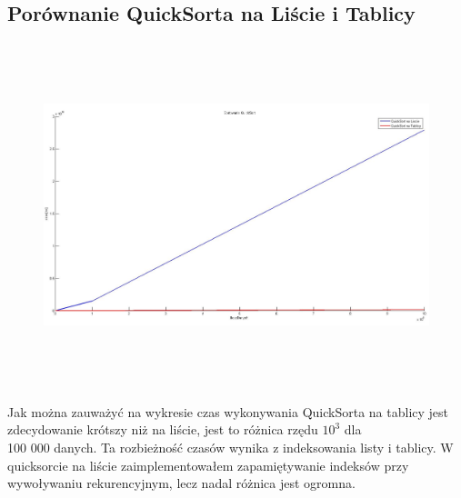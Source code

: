 \documentclass[a4paper,11pt]{article}
\begin{document}
\subsection{Porównanie QuickSorta na Liście i Tablicy}
\begin{center}
\begin{figure}[h!]
\includegraphics[width=12.5cm,height=10cm]{Wykresy2/QuickSortLista_Tablica}
\label{fig:obrazek Wykresy2/QuickSortLista_Tablica}
\end{figure}
\end{center}
Jak można zauważyć na wykresie czas wykonywania QuickSorta na tablicy jest zdecydowanie krótszy niż na liście, jest to różnica rzędu $10^{3}$ dla \\100 000 danych. Ta rozbieżność czasów wynika z indeksowania listy i tablicy. W quicksorcie na liście zaimplementowałem zapamiętywanie indeksów przy wywoływaniu rekurencyjnym, lecz nadal różnica jest ogromna.
\newpage
\end{document}
